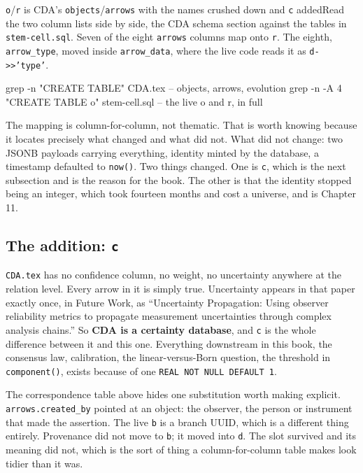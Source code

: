 \begin{Correspondence}{\texttt{o}/\texttt{r} is CDA's \texttt{objects}/\texttt{arrows} with the names crushed down and \texttt{c} added}{Read the two column lists side by side, the CDA schema section against the tables in \texttt{stem-cell.sql}.}
Seven of the eight \texttt{arrows} columns map onto \texttt{r}. The eighth, \texttt{arrow\_type}, moved inside \texttt{arrow\_data}, where the live code reads it as \texttt{d->>'type'}.
\begin{Check}
grep -n "CREATE TABLE" CDA.tex        -- objects, arrows, evolution
grep -n -A 4 "CREATE TABLE o" stem-cell.sql   -- the live o and r, in full
\end{Check}
The mapping is column-for-column, not thematic. That is worth knowing because it locates precisely what changed and what did not. What did not change: two JSONB payloads carrying everything, identity minted by the database, a timestamp defaulted to \texttt{now()}. Two things changed. One is \texttt{c}, which is the next subsection and is the reason for the book. The other is that the identity stopped being an integer, which took fourteen months and cost a universe, and is Chapter 11.
\end{Correspondence}

\subsection{The addition: \texttt{c}}

\texttt{CDA.tex} has no confidence column, no weight, no uncertainty anywhere at the relation level. Every arrow in it is simply true. Uncertainty appears in that paper exactly once, in Future Work, as ``Uncertainty Propagation: Using observer reliability metrics to propagate measurement uncertainties through complex analysis chains.'' So \textbf{CDA is a certainty database}, and \texttt{c} is the whole difference between it and this one. Everything downstream in this book, the consensus law, calibration, the linear-versus-Born question, the threshold in \texttt{component()}, exists because of one \texttt{REAL NOT NULL DEFAULT 1}.

The correspondence table above hides one substitution worth making explicit. \texttt{arrows.created\_by} pointed at an object: the observer, the person or instrument that made the assertion. The live \texttt{b} is a branch UUID, which is a different thing entirely. Provenance did not move to \texttt{b}; it moved into \texttt{d}. The slot survived and its meaning did not, which is the sort of thing a column-for-column table makes look tidier than it was.

